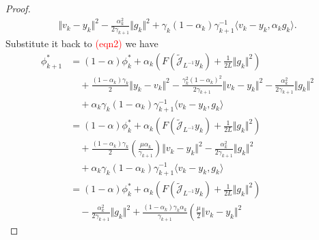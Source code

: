 \documentclass[12pt]{article}
\begin{document}
\begin{proof}
{\begin{align*}
            \Vert v_k - y_k\Vert^2 - 
            \frac{\alpha_k^2}{2 \gamma_{k + 1}} \Vert g_k\Vert^2
            + 
            \gamma_k(1 - \alpha_k)\gamma_{k + 1}^{-1} \langle v_k - y_k, \alpha_k g_k\rangle. 
        \end{align*}
        }
        Substitute it back to \textcolor{red}{(eqn2)} we have 
        \begin{align*}
            \phi_{k + 1}^* &= 
            (1 - \alpha)\phi_k^* + 
            \alpha_k
            \left(
                F\left(\widetilde{\mathcal J}_{L^{-1}} y_k\right) + 
                \frac{1}{2L}\Vert g_k\Vert^2
            \right)
            \\
            &\quad 
            + \frac{(1 - \alpha_k)\gamma_k}{2}\Vert y_k - v_k\Vert^2
            - \frac{\gamma_k^2(1 - \alpha_k)^2}{2\gamma_{k + 1}}\Vert v_k - y_k\Vert^2
            - \frac{\alpha_k^2}{2\gamma_{k + 1}}\Vert g_k\Vert^2
            \\
            &\quad 
            + \alpha_k\gamma_k(1 - \alpha_k)\gamma_{k + 1}^{-1}\langle v_k -y_k, g_k\rangle
            \\
            &= 
                (1 - \alpha)\phi_k^* + 
                \alpha_k
                \left(
                    F\left(\widetilde{\mathcal J}_{L^{-1}} y_k\right) + 
                    \frac{1}{2L}\Vert g_k\Vert^2
                \right)
                \\
                &\quad 
                + 
                \frac{(1 - \alpha_k)\gamma_k}{2}
                \left(
                    \frac{\mu \alpha_k}{\gamma_{k + 1}}
                \right)
                \Vert v_k - y_k\Vert^2
                - \frac{\alpha_k^2}{2\gamma_{k + 1}}\Vert g_k\Vert^2
                \\
                & \quad 
                + \alpha_k\gamma_k(1 - \alpha_k)\gamma_{k + 1}^{-1}\langle v_k -y_k, g_k\rangle
            \\
            &= 
                (1 - \alpha)\phi_k^* 
                + 
                \alpha_k
                \left(
                    F\left(\widetilde{\mathcal J}_{L^{-1}} y_k\right) + 
                    \frac{1}{2L}\Vert g_k\Vert^2
                \right)
                \\
                &\quad 
                - 
                \frac{\alpha_k^2}{2\gamma_{k + 1}}\Vert g_k\Vert^2
                + 
                \frac{(1 - \alpha_k)\gamma_k\alpha_k}{\gamma_{k + 1}}
                \left(
                    \frac{\mu}{2}\Vert v_k - y_k\Vert^2

\end{align*}
\end{proof}
\end{document}
